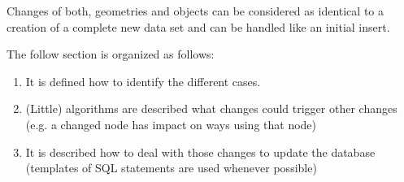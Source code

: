 Changes of both, geometries and objects can be considered as identical to a creation of
a complete new data set and can be handled like an initial insert.

The follow section is organized as follows:

\begin{enumerate}
\item It is defined how to identify the different cases.
\item (Little) algorithms are described what changes could trigger other changes
(e.g. a changed node has impact on ways using that node)
\item It is described how to deal with those changes to update the database (templates
of SQL statements are used whenever possible)
\end{enumerate}





